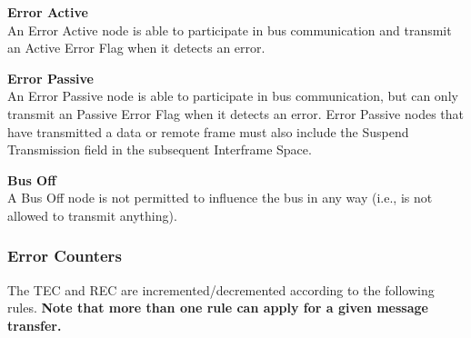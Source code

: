 \documentclass[main\_\_EN.tex]{subfiles}
\begin{document}
{\bfseries Error Active}\\
An Error Active node is able to participate in bus communication and transmit an Active Error Flag when it detects an error.

{\bfseries Error Passive}\\
An Error Passive node is able to participate in bus communication, but can only transmit an Passive Error Flag when it detects an error. Error Passive nodes that have transmitted a data or remote frame must also include the Suspend Transmission field in the subsequent Interframe Space.

\clearpage
{\bfseries Bus Off}\\
A Bus Off node is not permitted to influence the bus in any way (i.e., is not allowed to transmit anything).

\subsubsection{Error Counters}

The TEC and REC are incremented/decremented according to the following rules. \textbf{Note that more than one rule can apply for a given message transfer.}
\end{document}
